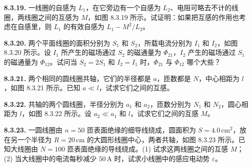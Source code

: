 \vfill
\newpage

\textbf{8.3.19.} 一线圈的自感为 $L_{1}$，在它旁边有一个自感为 $L_{2}$、电阻可略去不计的线圈，两线圈之间的互感为 $M$，如图 8.3.19 所示。试证明：如果把互感的作用也考虑在自感里，则 $L_{1}$ 的有效自感为 $L_{1} - M^{2} / L_{2}$。

\begin{center}
\end{center}

\vfill
\newpage

\textbf{8.3.20.} 两个平面线圈的面积分别为 $S_{1}$ 和 $S_{2}$，所载电流分别为 $I_{1}$ 和 $I_{2}$，如图 8.3.20 所示。设 $I_{1}$ 所产生的磁场通过 $S_{2}$ 的磁通量为 $\Phi_{21}$，$I_{2}$ 产生的磁场通过 $S_{1}$ 的磁通量为 $\Phi_{12}$。试问当 $S_{2} = 2S_{1}$ 和 $I_{2} = I_{1}$ 时，$\Phi_{21}$ 与 $\Phi_{12}$ 哪个大些？

\begin{center}
\end{center}

\vfill
\newpage

\textbf{8.3.21.} 两个相同的圆线圈共轴，它们的半径都是 $a$，匝数都是 $N$，中心相距为 $l$，如图 8.3.21 所示。已知 $a \ll l$，试求它们之间的互感。

\begin{center}
\end{center}

\vfill
\newpage

\textbf{8.3.22.} 共轴的两个圆线圈，半径分别为 $a_1$ 和 $a_2$，匝数分别为 $N_1$ 和 $N_2$，圆心相距为 $l$，如图 8.3.22 所示。设 $a_2 \ll a_1$ 和 $l$，试求它们之间的互感 $M$。

\begin{center}
\end{center}

\vfill
\newpage

\textbf{8.3.23.} 一圆线圈由 $n = 50$ 匝表面绝缘的细导线绕成，圆面积为 $S = 4.0\,\mathrm{cm}^{2}$，放在另一个半径为 $R = 20\,\mathrm{cm}$ 的大圆形线圈中心，两者共轴，如图 8.3.23 所示。已知大线圈由 $N = 100$ 匝表面绝缘的导线绕成。(1) 试求这两线圈之间的互感 $M$；(2) 当大线圈中的电流每秒减少 $50\,\mathrm{A}$ 时，试求小线圈中的感应电动势 $\varepsilon$。

\begin{center}
\end{center}

